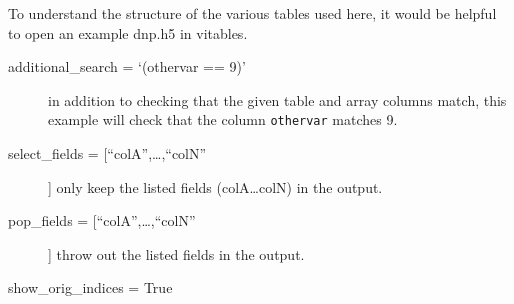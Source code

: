To understand the structure of the various tables used here, it
    would be helpful to open an example dnp.h5 in vitables.

    \begin{mykwargs}
        \begin{description}
            \item[additional\_search = `(othervar == 9)']
                in addition to checking that the given table and
                array columns match, this example will check that the
                column \texttt{othervar} matches 9.
            \item[select\_fields = [``colA'',\ldots,``colN''] ] only
                keep the listed fields (colA\ldots colN) in the output.
            \item[pop\_fields = [``colA'',\ldots,``colN''] ] 
                throw out the listed fields in the output.
            \item[show\_orig\_indices = True]
        \end{description}
    \end{mykwargs}

